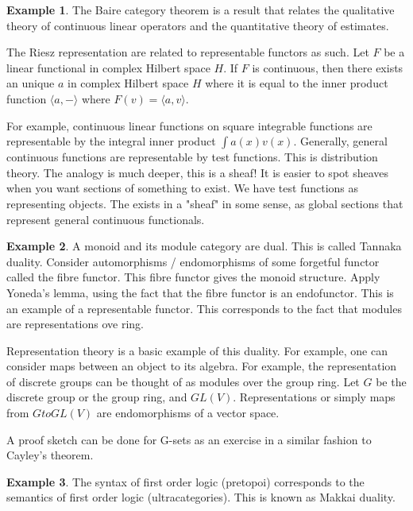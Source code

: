 \documentclass[10pt]{article}
\theoremstyle{plain}%
\theoremstyle{definition}
\newtheorem{example}{Example}[section]
\theoremstyle{remark}
\begin{document}
\begin{example}
	The Baire category theorem is a result that relates the qualitative theory of continuous linear operators and the quantitative theory of estimates.

	The Riesz representation are related to representable functors as such. Let $F$ be a linear functional in complex Hilbert space $H$. If $F$ is continuous, then there exists an unique $a$ in complex Hilbert space $H$ where it is equal to the inner product function $\langle a, - \rangle$ where $F(v) = \langle a, v \rangle$.

	For example, continuous linear functions on square integrable functions are representable by the integral inner product $\int a(x) v(x)$. Generally, general continuous functions are representable by test functions. This is distribution theory. The analogy is much deeper, this is a sheaf! It is easier to spot sheaves when you want sections of something to exist. We have test functions as representing objects. The exists in a "sheaf" in some sense, as global sections that represent general continuous functionals.
\end{example}

\begin{example}
	A monoid and its module category are dual. This is called Tannaka duality. Consider automorphisms / endomorphisms of some forgetful functor called the fibre functor. This fibre functor gives the monoid structure. Apply Yoneda's lemma, using the fact that the fibre functor is an endofunctor. This is an example of a representable functor. This corresponds to the fact that modules are representations ove ring.

	Representation theory is a basic example of this duality. For example, one can consider maps between an object to its algebra. For example, the representation of discrete groups can be thought of as modules over the group ring. Let $G$ be the discrete group or the group ring, and $GL(V)$. Representations or simply maps from $G to GL(V)$ are endomorphisms of a vector space.

	A proof sketch can be done for G-sets as an exercise in a similar fashion to Cayley's theorem.
\end{example}

\begin{example}
	The syntax of first order logic (pretopoi) corresponds to the semantics of first order logic (ultracategories). This is known as Makkai duality.
\end{example}
\end{document}
